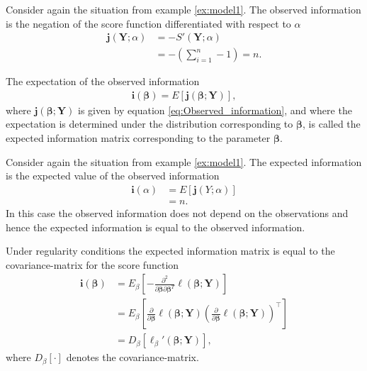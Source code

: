 \begin{example}
    Consider again the situation from example \ref{ex:model1}. The observed information is the negation of the score function differentiated with respect to $\alpha$
    \begin{align*}
        \textbf{j}\left( \textbf{Y}; \alpha \right) &= - S'\left(\textbf{Y}; \alpha \right)\\
        &=  - \left( \sum_{i = 1}^n -1\right) = n.
    \end{align*}
\end{example}

\begin{definition} 
\label{def:expected_information}
The expectation of the observed information 
\begin{align}
    \textbf{i}(\boldsymbol{\beta}) = E[\textbf{j}(\boldsymbol{\beta};\textbf{Y})],
\end{align}
where $\textbf{j}(\boldsymbol{\beta};\textbf{Y})$ is given by equation \eqref{eq:Observed_information}, and where the expectation is determined under the distribution corresponding to $\boldsymbol{\beta}$, is called the expected information matrix corresponding to the parameter $\boldsymbol{\beta}$.
\end{definition}

\begin{example}
Consider again the situation from example \ref{ex:model1}. The expected information is the expected value of the observed information
    \begin{align*}
        \textbf{i}\left(\alpha \right) &= E\left[\textbf{j}(Y;\alpha)\right]\\
        &= n.
    \end{align*}
    In this case the observed information does not depend on the observations and hence the expected information is equal to the observed information.
\end{example}

\begin{lemma}
\label{lem:fisher_information_matrix}
Under regularity conditions the expected information matrix is equal to the covariance-matrix for the score function
\begin{align*}
    \textbf{i}(\boldsymbol{\beta}) &= E_{\beta}\left[- \frac{\partial^2}{\partial \boldsymbol{\beta} \partial \boldsymbol{\beta}^T} \ell(\boldsymbol{\beta}; \textbf{Y})\right] \\
    &= E_{\beta}\left[ \frac{\partial}{\partial \boldsymbol{\beta}}\ell (\boldsymbol{\beta}; \textbf{Y}) \left( \frac{\partial}{\partial \boldsymbol{\beta}} \ell (\boldsymbol{\beta}; \textbf{Y}) \right)^\top \right] \\
    &= D_{\beta} [\ell_\beta ' (\boldsymbol{\beta}; \textbf{Y})],
\end{align*}
where $D_\beta[\cdot]$ denotes the covariance-matrix. 
\end{lemma}

